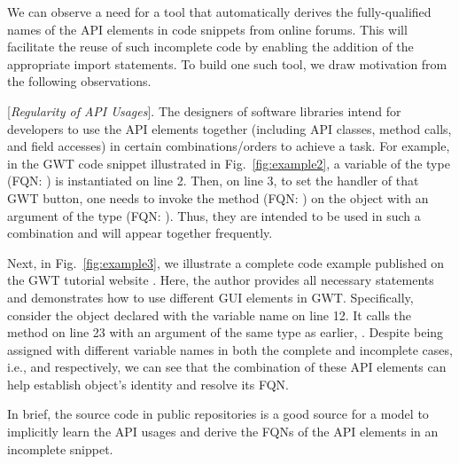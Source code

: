 We can observe a need for a tool that automatically derives the fully-qualified names of the API elements in code snippets from online forums. This will facilitate the reuse of such incomplete code by enabling the addition of the appropriate import statements. To build one such tool, we draw motivation from the following observations.

\vspace{2pt}
 [{\em Regularity of API Usages}]. The designers of software libraries intend for developers to use the API elements together (including API classes, method calls, and field accesses) in certain combinations/orders to achieve a task. For example, in the GWT code snippet illustrated in Fig.~\ref{fig:example2}, a variable of the type  (FQN: ) is instantiated on line 2. Then, on line 3, to set the handler of that GWT button, one needs to invoke the  method (FQN: )  on the  object with an argument of the type  (FQN: ). Thus, they are intended to be used in  such a combination and will appear together frequently.

Next, in Fig.~\ref{fig:example3}, we illustrate a complete code example published on the GWT tutorial website . Here, the author provides all necessary  statements and demonstrates how to use different GUI elements in GWT. Specifically, consider the  object declared with the  variable name on line 12. It calls the method  on line 23 with an argument of the same type as earlier, . 
Despite being assigned with different variable names in both the complete and incomplete cases, i.e.,  and  respectively, we can see that the combination of these API elements can help establish  object's identity and resolve its FQN.

In brief, the source code in public repositories is a good source for a model to implicitly learn the API usages and derive the FQNs of the API elements in an incomplete snippet.

